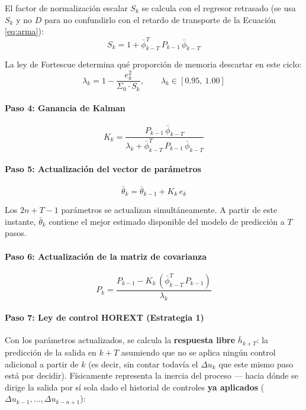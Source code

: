 El factor de normalización escalar $S_k$ se calcula con el regresor retrasado (se usa $S_k$ y no $D$ para no confundirlo con el retardo de transporte de la Ecuación \ref{eq:arma}):
\[
    S_k = 1 + \bar{\phi}_{k-T}^T\, P_{k-1}\, \bar{\phi}_{k-T}
\]

La ley de Fortescue determina qué proporción de memoria descartar en este ciclo:
\[
    \lambda_k = 1 - \frac{e_k^2}{\Sigma_0 \cdot S_k}, \qquad \lambda_k \in [0.95,\ 1.00]
\]

\paragraph{Paso 4: Ganancia de Kalman}

\[
    K_k = \frac{P_{k-1}\,\bar{\phi}_{k-T}}{\lambda_k + \bar{\phi}_{k-T}^T\, P_{k-1}\,\bar{\phi}_{k-T}}
\]

\paragraph{Paso 5: Actualización del vector de parámetros}

\[
    \bar{\theta}_k = \bar{\theta}_{k-1} + K_k\, e_k
\]

Los $2n+T-1$ parámetros se actualizan simultáneamente. A partir de este instante, $\bar{\theta}_k$ contiene el mejor estimado disponible del modelo de predicción a $T$ pasos.

\paragraph{Paso 6: Actualización de la matriz de covarianza}

\[
    P_k = \frac{P_{k-1} - K_k\,(\bar{\phi}_{k-T}^T\, P_{k-1})}{\lambda_k}
\]

\paragraph{Paso 7: Ley de control HOREXT (Estrategia 1)}

Con los parámetros actualizados, se calcula la \textbf{respuesta libre} $\bar{h}_{k+T}$: la predicción de la salida en $k+T$ asumiendo que no se aplica ningún control adicional a partir de $k$ (es decir, sin contar todavía el $\Delta u_k$ que este mismo paso está por decidir). Físicamente representa la inercia del proceso — hacia dónde se dirige la salida por sí sola dado el historial de controles \textbf{ya aplicados} ($\Delta u_{k-1}, \ldots, \Delta u_{k-n+1}$):

